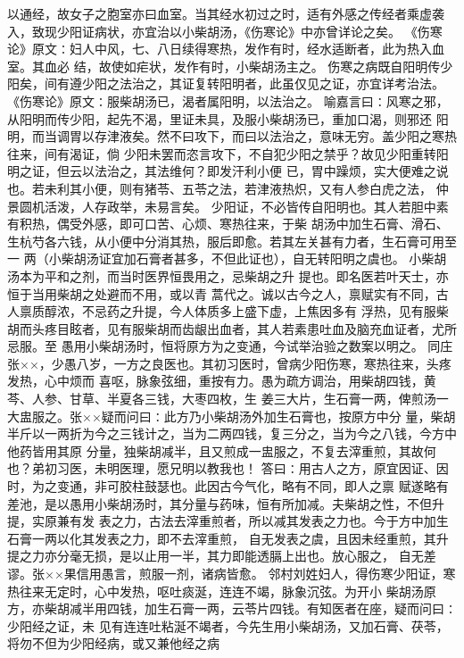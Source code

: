 \documentclass[a4paper,12pt,UTF8,twoside]{ctexbook}
\begin{document}
以通经，故女子之胞室亦曰血室。当其经水初过之时，适有外感之传经者乘虚袭 
入，致现少阳证病状，亦宜治以小柴胡汤，《伤寒论》中亦曾详论之矣。 
《伤寒论》原文∶妇人中风，七、八日续得寒热，发作有时，经水适断者，此为热入血室。其血必 
结，故使如疟状，发作有时，小柴胡汤主之。 
伤寒之病既自阳明传少阳矣，间有遵少阳之法治之，其证复转阳明者，此虽仅见之证，亦宜详考治法。 
《伤寒论》原文∶服柴胡汤已，渴者属阳明，以法治之。 
喻嘉言曰∶风寒之邪，从阳明而传少阳，起先不渴，里证未具，及服小柴胡汤已，重加口渴，则邪还 
阳明，而当调胃以存津液矣。然不曰攻下，而曰以法治之，意味无穷。盖少阳之寒热往来，间有渴证，倘 
少阳未罢而恣言攻下，不自犯少阳之禁乎？故见少阳重转阳明之证，但云以法治之，其法维何？即发汗利小便 
已，胃中躁烦，实大便难之说也。若未利其小便，则有猪苓、五苓之法，若津液热炽，又有人参白虎之法， 
仲景圆机活泼，人存政举，未易言矣。 
少阳证，不必皆传自阳明也。其人若胆中素有积热，偶受外感，即可口苦、心烦、寒热往来，于柴 
胡汤中加生石膏、滑石、生杭芍各六钱，从小便中分消其热，服后即愈。若其左关甚有力者，生石膏可用至一 
两（小柴胡汤证宜加石膏者甚多，不但此证也），自无转阳明之虞也。 
小柴胡汤本为平和之剂，而当时医界恒畏用之，忌柴胡之升 
提也。即名医若叶天士，亦恒于当用柴胡之处避而不用，或以青 
蒿代之。诚以古今之人，禀赋实有不同，古人禀质醇浓，不忌药之升提，今人体质多上盛下虚，上焦因多有 
浮热，见有服柴胡而头疼目眩者，见有服柴胡而齿龈出血者，其人若素患吐血及脑充血证者，尤所忌服。至 
愚用小柴胡汤时，恒将原方为之变通，今试举治验之数案以明之。 
同庄张××，少愚八岁，一方之良医也。其初习医时，曾病少阳伤寒，寒热往来，头疼发热，心中烦而 
喜呕，脉象弦细，重按有力。愚为疏方调治，用柴胡四钱，黄芩、人参、甘草、半夏各三钱，大枣四枚，生 
姜三大片，生石膏一两，俾煎汤一大盅服之。张××疑而问曰∶此方乃小柴胡汤外加生石膏也，按原方中分 
量，柴胡半斤以一两折为今之三钱计之，当为二两四钱，复三分之，当为今之八钱，今方中他药皆用其原 
分量，独柴胡减半，且又煎成一盅服之，不复去滓重煎，其故何也？弟初习医，未明医理，愿兄明以教我也！ 
答曰∶用古人之方，原宜因证、因时，为之变通，非可胶柱鼓瑟也。此因古今气化，略有不同，即人之禀 
赋遂略有差池，是以愚用小柴胡汤时，其分量与药味，恒有所加减。夫柴胡之性，不但升提，实原兼有发 
表之力，古法去滓重煎者，所以减其发表之力也。今于方中加生石膏一两以化其发表之力，即不去滓重煎， 
自无发表之虞，且因未经重煎，其升提之力亦分毫无损，是以止用一半，其力即能透膈上出也。放心服之， 
自无差谬。张××果信用愚言，煎服一剂，诸病皆愈。 
邻村刘姓妇人，得伤寒少阳证，寒热往来无定时，心中发热，呕吐痰涎，连连不竭，脉象沉弦。为开小 
柴胡汤原方，亦柴胡减半用四钱，加生石膏一两，云苓片四钱。有知医者在座，疑而问曰∶少阳经之证，未 
见有连连吐粘涎不竭者，今先生用小柴胡汤，又加石膏、茯苓，将勿不但为少阳经病，或又兼他经之病 
\end{document}
